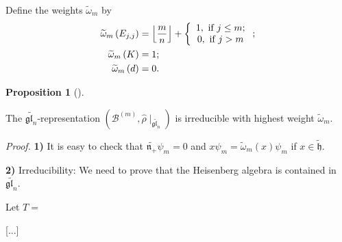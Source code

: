\documentclass
[numbers=enddot,12pt,final,onecolumn,german,notitlepage]{scrartcl}%
\theoremstyle{definition}
\newtheorem{prop}[theo]{Proposition}
\newenvironment{proposition}[1][]
{\begin{prop}[#1]\begin{leftbar}}
{\end{leftbar}\end{prop}}
\begin{document}
Define the weights $\widetilde{\omega}_{m}$ by%
\begin{align*}
\widetilde{\omega}_{m}\left(  E_{j,j}\right)   &  =\left\lfloor \dfrac{m}%
{n}\right\rfloor +\left\{
\begin{array}
[c]{c}%
1,\text{ if }j\leq m;\\
0,\text{ if }j>m
\end{array}
\right.  ;\\
\widetilde{\omega}_{m}\left(  K\right)   &  =1;\\
\widetilde{\omega}_{m}\left(  d\right)   &  =0.
\end{align*}


\begin{proposition}
The $\widetilde{\mathfrak{gl}_{n}}$-representation $\left(  \mathcal{B}%
^{\left(  m\right)  },\widehat{\rho}\mid_{\widetilde{\mathfrak{gl}_{n}}%
}\right)  $ is irreducible with highest weight $\widetilde{\omega}_{m}$.
\end{proposition}

\textit{Proof.} \textbf{1)} It is easy to check that $\widetilde{\mathfrak{n}%
_{+}}\psi_{m}=0$ and $x\psi_{m}=\widetilde{\omega}_{m}\left(  x\right)
\psi_{m}$ if $x\in\widetilde{\mathfrak{h}}$.

\textbf{2)} Irreducibility: We need to prove that the Heisenberg algebra is
contained in $\widetilde{\mathfrak{gl}_{n}}$.

Let $T=$

[...]
\end{document}
